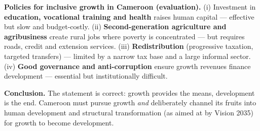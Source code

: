 \documentclass[11pt]{article}
\begin{document}
\begin{corrige}
\textbf{Policies for inclusive growth in Cameroon (evaluation).} (i) Investment in \textbf{education, vocational training and health} raises human capital — effective but slow and budget-costly. (ii) \textbf{Second-generation agriculture and agribusiness} create rural jobs where poverty is concentrated — but requires roads, credit and extension services. (iii) \textbf{Redistribution} (progressive taxation, targeted transfers) — limited by a narrow tax base and a large informal sector. (iv) \textbf{Good governance and anti-corruption} ensure growth revenues finance development — essential but institutionally difficult.

\textbf{Conclusion.} The statement is correct: growth provides the means, development is the end. Cameroon must pursue growth \emph{and} deliberately channel its fruits into human development and structural transformation (as aimed at by Vision 2035) for growth to become development.
\end{corrige}
\end{document}

